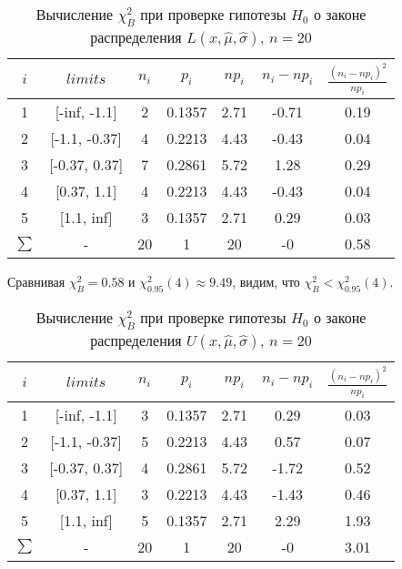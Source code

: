 \documentclass{article}
\begin{document}
\begin{table}[H]
	\centering
	\begin{tabular}{| c | c | c | c | c | c | c |}
		\hline
		$i$ & $limits$         &   $n_i$ &    $p_i$ &   $np_i$ &   $n_i - np_i$ &   $\frac{(n_i-np_i)^2}{np_i}$ \\
		\hline
   1 & [-inf, -1.1] &     2 & 0.1357 &   2.71 &        -0.71 &                        0.19 \\
   2 & [-1.1, -0.37]  &     4 & 0.2213 &   4.43 &        -0.43 &                        0.04 \\
   3 & [-0.37, 0.37]  &     7 & 0.2861 &   5.72 &         1.28 &                        0.29 \\
   4 & [0.37, 1.1]    &     4 & 0.2213 &   4.43 &        -0.43 &                        0.04 \\
   5 & [1.1, inf]   &     3 & 0.1357 &   2.71 &         0.29 &                        0.03 \\
   $\sum$ & -              &    20 & 1      &  20    &        -0    &                        0.58 \\
\hline

	\end{tabular}
	\caption{ Вычисление $\chi^{2}_{B}$ при проверке гипотезы $H_{0}$ о законе распределения $L(x,\hat{\mu}, \hat{\sigma})$, $n=20$}
	\label{tab:laplace_chi_2}
\end{table}

\noindent Сравнивая $\chi^{2}_{B} = 0.58$ и $\chi^{2}_{0.95}(4) \approx 9.49$, видим, что $\chi^{2}_{B} < \chi^{2}_{0.95}(4)$.
\\

\begin{table}[H]
	\centering
	\begin{tabular}{| c | c | c | c | c | c | c |}
		\hline
		$i$ & $limits$         &   $n_i$ &    $p_i$ &   $np_i$ &   $n_i - np_i$ &   $\frac{(n_i-np_i)^2}{np_i}$ \\
		\hline
   1 & [-inf, -1.1] &     3 & 0.1357 &   2.71 &         0.29 &                        0.03 \\
   2 & [-1.1, -0.37]  &     5 & 0.2213 &   4.43 &         0.57 &                        0.07 \\
   3 & [-0.37, 0.37]  &     4 & 0.2861 &   5.72 &        -1.72 &                        0.52 \\
   4 & [0.37, 1.1]    &     3 & 0.2213 &   4.43 &        -1.43 &                        0.46 \\
   5 & [1.1, inf]   &     5 & 0.1357 &   2.71 &         2.29 &                        1.93 \\
    $\sum$ & -              &    20 & 1      &  20    &        -0    &                        3.01 \\
\hline
	\end{tabular}
	\caption{ Вычисление $\chi^{2}_{B}$ при проверке гипотезы $H_{0}$ о законе распределения $U(x,\hat{\mu}, \hat{\sigma})$, $n=20$}
	\label{tab:uniform_chi_2}
\end{table}
\end{document}
